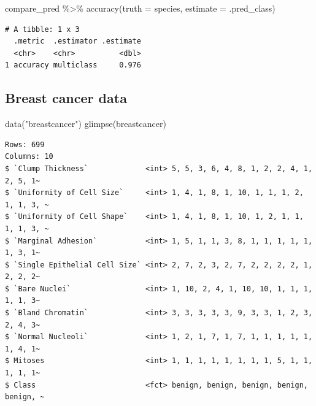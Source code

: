 \documentclass[
  letterpaper,
  DIV=11,
  numbers=noendperiod]{scrreprt}
\newenvironment{Shaded}{\begin{snugshade}}{\end{snugshade}}
\newcommand{\AttributeTok}[1]{\textcolor[rgb]{0.40,0.45,0.13}{#1}}
\newcommand{\FunctionTok}[1]{\textcolor[rgb]{0.28,0.35,0.67}{#1}}
\newcommand{\NormalTok}[1]{\textcolor[rgb]{0.00,0.23,0.31}{#1}}
\newcommand{\SpecialCharTok}[1]{\textcolor[rgb]{0.37,0.37,0.37}{#1}}
\newcommand{\StringTok}[1]{\textcolor[rgb]{0.13,0.47,0.30}{#1}}
\begin{document}
\begin{Shaded}
\begin{Highlighting}[]
\NormalTok{compare\_pred }\SpecialCharTok{\%\textgreater{}\%}  \FunctionTok{accuracy}\NormalTok{(}\AttributeTok{truth =}\NormalTok{ species, }\AttributeTok{estimate =}\NormalTok{ .pred\_class)}
\end{Highlighting}
\end{Shaded}

\begin{verbatim}
# A tibble: 1 x 3
  .metric  .estimator .estimate
  <chr>    <chr>          <dbl>
1 accuracy multiclass     0.976
\end{verbatim}

\hypertarget{breast-cancer-data}{%
\subsection{Breast cancer data}\label{breast-cancer-data}}

\begin{Shaded}
\begin{Highlighting}[]
\FunctionTok{data}\NormalTok{(}\StringTok{"breastcancer"}\NormalTok{)}
\FunctionTok{glimpse}\NormalTok{(breastcancer)}
\end{Highlighting}
\end{Shaded}

\begin{verbatim}
Rows: 699
Columns: 10
$ `Clump Thickness`             <int> 5, 5, 3, 6, 4, 8, 1, 2, 2, 4, 1, 2, 5, 1~
$ `Uniformity of Cell Size`     <int> 1, 4, 1, 8, 1, 10, 1, 1, 1, 2, 1, 1, 3, ~
$ `Uniformity of Cell Shape`    <int> 1, 4, 1, 8, 1, 10, 1, 2, 1, 1, 1, 1, 3, ~
$ `Marginal Adhesion`           <int> 1, 5, 1, 1, 3, 8, 1, 1, 1, 1, 1, 1, 3, 1~
$ `Single Epithelial Cell Size` <int> 2, 7, 2, 3, 2, 7, 2, 2, 2, 2, 1, 2, 2, 2~
$ `Bare Nuclei`                 <int> 1, 10, 2, 4, 1, 10, 10, 1, 1, 1, 1, 1, 3~
$ `Bland Chromatin`             <int> 3, 3, 3, 3, 3, 9, 3, 3, 1, 2, 3, 2, 4, 3~
$ `Normal Nucleoli`             <int> 1, 2, 1, 7, 1, 7, 1, 1, 1, 1, 1, 1, 4, 1~
$ Mitoses                       <int> 1, 1, 1, 1, 1, 1, 1, 1, 5, 1, 1, 1, 1, 1~
$ Class                         <fct> benign, benign, benign, benign, benign, ~
\end{verbatim}
\end{document}

